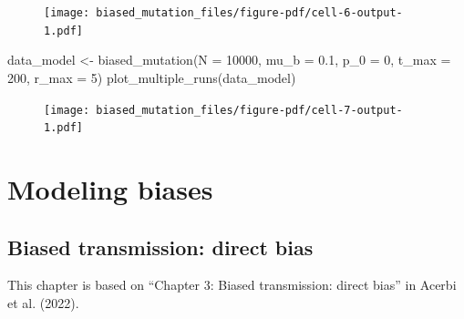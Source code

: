 \documentclass[
  a4paperpaper,
  ,captions=tableheading
]{scrbook}
\newenvironment{Shaded}{\begin{snugshade}}{\end{snugshade}}
\newcommand{\DecValTok}[1]{\textcolor[rgb]{0.68,0.00,0.00}{#1}}
\newcommand{\FloatTok}[1]{\textcolor[rgb]{0.68,0.00,0.00}{#1}}
\newcommand{\NormalTok}[1]{\textcolor[rgb]{0.00,0.23,0.31}{#1}}
\newcommand{\OperatorTok}[1]{\textcolor[rgb]{0.37,0.37,0.37}{#1}}
\begin{document}
\begin{figure}[H]

{\centering \texttt{[image: biased\_mutation\_files/figure-pdf/cell-6-output-1.pdf]}

}

\end{figure}

\begin{Shaded}
\begin{Highlighting}[]
\NormalTok{data\_model }\OperatorTok{\textless{}{-}}\NormalTok{ biased\_mutation(N }\OperatorTok{=} \DecValTok{10000}\NormalTok{, mu\_b }\OperatorTok{=} \FloatTok{0.1}\NormalTok{, p\_0 }\OperatorTok{=} \DecValTok{0}\NormalTok{, t\_max }\OperatorTok{=} \DecValTok{200}\NormalTok{, r\_max }\OperatorTok{=} \DecValTok{5}\NormalTok{)}
\NormalTok{plot\_multiple\_runs(data\_model)}
\end{Highlighting}
\end{Shaded}

\begin{figure}[H]

{\centering \texttt{[image: biased\_mutation\_files/figure-pdf/cell-7-output-1.pdf]}

}

\end{figure}

\part{Modeling biases}

\hypertarget{sec-direct-biased-transmission}{%
\chapter{Biased transmission: direct
bias}\label{sec-direct-biased-transmission}}

\begin{tcolorbox}[enhanced jigsaw, arc=.35mm, colbacktitle=quarto-callout-note-color!10!white, colback=white, breakable, toprule=.15mm, title=\textcolor{quarto-callout-note-color}{\faInfo}\hspace{0.5em}{Note}, left=2mm, bottomtitle=1mm, toptitle=1mm, leftrule=.75mm, opacitybacktitle=0.6, titlerule=0mm, opacityback=0, rightrule=.15mm, bottomrule=.15mm, coltitle=black, colframe=quarto-callout-note-color-frame]

This chapter is based on ``Chapter 3: Biased transmission: direct bias''
in Acerbi et al. (2022).

\end{tcolorbox}
\end{document}
